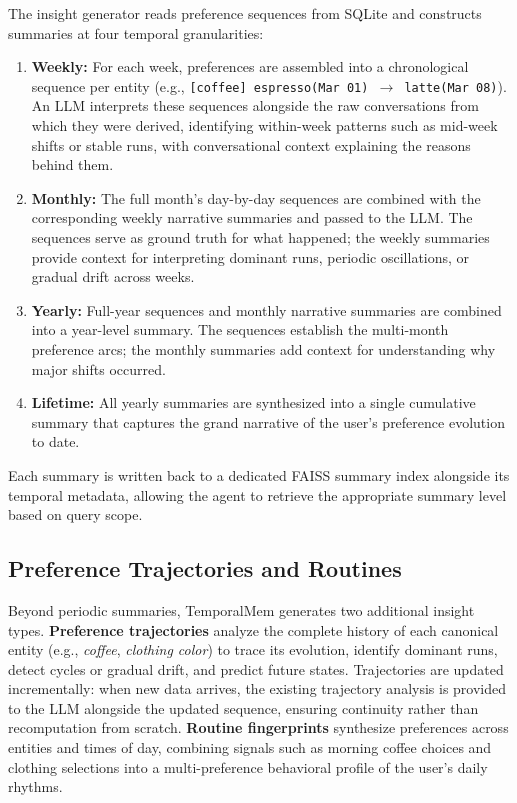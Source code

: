 \documentclass{article}
\begin{document}
The insight generator reads preference sequences from SQLite and constructs summaries at four temporal granularities:

\begin{enumerate}
    \item \textbf{Weekly:} For each week, preferences are assembled into a chronological sequence per entity (e.g., \texttt{[coffee] espresso(Mar 01) $\to$ latte(Mar 08)}). An LLM interprets these sequences alongside the raw conversations from which they were derived, identifying within-week patterns such as mid-week shifts or stable runs, with conversational context explaining the reasons behind them.
    \item \textbf{Monthly:} The full month's day-by-day sequences are combined with the corresponding weekly narrative summaries and passed to the LLM. The sequences serve as ground truth for what happened; the weekly summaries provide context for interpreting dominant runs, periodic oscillations, or gradual drift across weeks.
    \item \textbf{Yearly:} Full-year sequences and monthly narrative summaries are combined into a year-level summary. The sequences establish the multi-month preference arcs; the monthly summaries add context for understanding why major shifts occurred.
    \item \textbf{Lifetime:} All yearly summaries are synthesized into a single cumulative summary that captures the grand narrative of the user's preference evolution to date.
\end{enumerate}

Each summary is written back to a dedicated FAISS summary index alongside its temporal metadata, allowing the agent to retrieve the appropriate summary level based on query scope.

\subsection{Preference Trajectories and Routines}

Beyond periodic summaries, TemporalMem generates two additional insight types. \textbf{Preference trajectories} analyze the complete history of each canonical entity (e.g., \textit{coffee}, \textit{clothing color}) to trace its evolution, identify dominant runs, detect cycles or gradual drift, and predict future states. Trajectories are updated incrementally: when new data arrives, the existing trajectory analysis is provided to the LLM alongside the updated sequence, ensuring continuity rather than recomputation from scratch. \textbf{Routine fingerprints} synthesize preferences across entities and times of day, combining signals such as morning coffee choices and clothing selections into a multi-preference behavioral profile of the user's daily rhythms.
\end{document}
